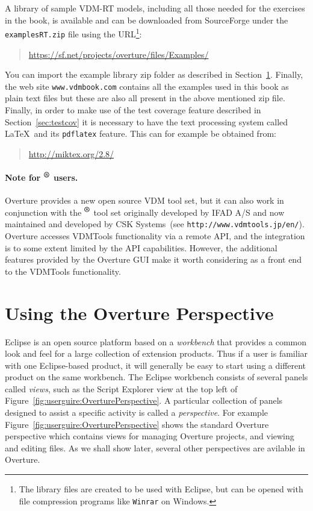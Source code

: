 A library of sample VDM-RT models, including all those needed
for the exercises in the book, is available and can be downloaded from
SourceForge under the \texttt{examplesRT.zip} file using the
URL\footnote{The library files are created to be used with Eclipse,
  but can be opened with file compression programs like \texttt{Winrar} on
  Windows.}:
\begin{quote}
\url{https://sf.net/projects/overture/files/Examples/}
\end{quote}
You can import the example library zip folder as described in
Section~\ref{sec:vdmsupport}.  Finally, the web site
\texttt{www.vdmbook.com} contains all the examples used in this book
as plain text files but these are also all present in the above
mentioned zip file. Finally, in order to make use of the
test coverage feature described in Section~\ref{sec:testcov} it is
necessary to have the text processing system called \LaTeX\ and its
\texttt{pdflatex} feature. This can for example be obtained from:
\begin{quote}
\url{http://miktex.org/2.8/}
\end{quote}

\paragraph{Note for \vdmtools$^{\mbox{\small\textbf{{\textregistered}}}}$ users.} 
Overture provides a new open source VDM tool set, but it can also work
in conjunction with the
\vdmtools$^{\mbox{\small\textbf{{\textregistered}}}}$
tool set originally developed by IFAD A/S and now maintained and
developed by CSK Systems~(see
\texttt{http://www.vdmtools.jp/en/}). Overture accesses VDMTools
functionality via a remote API, and the integration is to some extent
limited by the API capabilities. However, the additional features
provided by the Overture GUI make it worth considering as a front end
to the VDMTools functionality.
 
\section{Using the Overture Perspective}\label{sec:vdmsupport}

Eclipse is an open source platform based on a \emph{workbench} that
provides a common look and feel for a large collection of extension
products. Thus if a user is familiar with one Eclipse-based product,
it will generally be easy to start using a different product on the
same workbench. The Eclipse workbench consists of several panels
called \emph{views}, such as the Script Explorer view at the top left
of Figure~\ref{fig:userguire:OverturePerspective}. A particular
collection of panels designed to assist a specific activity is called a
\emph{perspective}. For example
Figure~\ref{fig:userguire:OverturePerspective} shows the standard
Overture perspective which contains views for managing Overture
projects, and viewing and editing files. As we shall show later,
several other perspectives are avilable in Overture.

